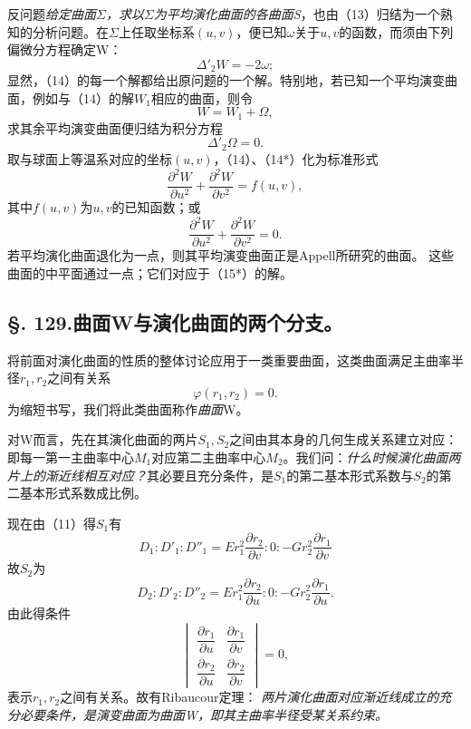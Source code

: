反问题\emph{给定曲面\(\Sigma\)，求以\(\Sigma\)为平均演化曲面的各曲面S}，也由（13）归结为一个熟知的分析问题。在\(\Sigma\)上任取坐标系\((u,v)\)，便已知\(\omega\)关于\(u,v\)的函数，而须由下列偏微分方程确定W：
\begin{equation}\tag{14}
 \Delta'_2 W=-2\omega;
\end{equation}
显然，（14）的每一个解都给出原问题的一个解。特别地，若已知一个平均演变曲面，例如与（14）的解\(W_1\)相应的曲面，则令
\[
 W=W_1+\Omega,
\]
求其余平均演变曲面便归结为积分方程
\begin{equation}\tag{14*}
 \Delta'_2\Omega=0.
\end{equation}
取与球面上等温系对应的坐标\((u,v)\)，（14）、（14*）化为标准形式
\begin{equation}\tag{15}
 \frac{\partial^2 W}{\partial u^2}+\frac{\partial^2 W}{\partial v^2}=f(u,v),
\end{equation}
其中\(f(u,v)\)为\(u,v\)的已知函数；或
\begin{equation}\tag{15*}
 \frac{\partial^2 W}{\partial u^2}+\frac{\partial^2 W}{\partial v^2}=0.
\end{equation}
若平均演化曲面退化为一点，则其平均演变曲面正是Appell所研究的曲面。
这些曲面的中平面通过一点；它们对应于（15*）的解。


\subsection*{\S. 129.\quad 曲面W与演化曲面的两个分支。}

将前面对演化曲面的性质的整体讨论应用于一类重要曲面，这类曲面满足主曲率半径\(r_1,r_2\)之间有关系
\[
 \varphi(r_1,r_2)=0.
\]
为缩短书写，我们将此类曲面称作\emph{曲面}W。

对W而言，先在其演化曲面的两片\(S_1,S_2\)之间由其本身的几何生成关系建立对应：即每一第一主曲率中心\(M_1\)对应第二主曲率中心\(M_2\)。我们问：\emph{什么时候演化曲面两片上的渐近线相互对应？}其必要且充分条件，是\(S_1\)的第二基本形式系数与\(S_2\)的第二基本形式系数成比例。

现在由（11）得\(S_1\)有
\[
 D_1:D'_1:D''_1=E r_1^2\frac{\partial r_2}{\partial v}:0:-G r_2^2\frac{\partial r_1}{\partial v}
\]
故\(S_2\)为
\[
 D_2:D'_2:D''_2=E r_1^2\frac{\partial r_2}{\partial u}:0:-G r_2^2\frac{\partial r_1}{\partial u}.
\]
由此得条件
\[
 \begin{vmatrix}
 \dfrac{\partial r_1}{\partial u} & \dfrac{\partial r_1}{\partial v}\\[0.6em]
 \dfrac{\partial r_2}{\partial u} & \dfrac{\partial r_2}{\partial v}
 \end{vmatrix}=0,
\]
表示\(r_1,r_2\)之间有关系。故有Ribaucour定理：
\emph{两片演化曲面对应渐近线成立的充分必要条件，是演变曲面为曲面W，即其主曲率半径受某关系约束。}

